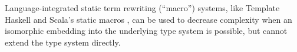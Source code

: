 \documentclass[10pt,preprint]{sigplanconf}
\begin{document}
Language-integrated static term rewriting  (``macro'') systems, like Template Haskell \cite{SheardPeytonJones:Haskell-02} and Scala's static macros \cite{ScalaMacros2013}, can be used to decrease complexity when an isomorphic embedding into the underlying type system is possible, but cannot extend the type system directly.%

\end{document}
